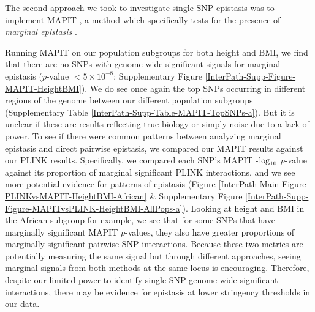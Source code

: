 \documentclass[12pt,a4paper]{article}
\def\log{{\rm log}}
\begin{document}
The second approach we took to investigate single-SNP epistasis was to implement MAPIT \citep{Crawford2017a}, a method which specifically tests for the presence of \textit{marginal epistasis} . 



Running MAPIT on our population subgroups for both height and BMI, we find that there are no SNPs with genome-wide significant signals for marginal epistasis ($p$-value $< 5\times10^{-8}$; Supplementary Figure \ref{InterPath-Supp-Figure-MAPIT-HeightBMI}). We do see once again the top SNPs occurring in different regions of the genome between our different population subgroups (Supplementary Table \ref{InterPath-Supp-Table-MAPIT-TopSNPs-a}). But it is unclear if these are results reflecting true biology or simply noise due to a lack of power. To see if there were common patterns between analyzing marginal epistasis and direct pairwise epistasis, we compared our MAPIT results against our PLINK results. Specifically, we compared each SNP's MAPIT -$\log_{10}$ $p$-value against its proportion of marginal significant PLINK interactions, and we see more potential evidence for patterns of epistasis (Figure \ref{InterPath-Main-Figure-PLINKvsMAPIT-HeightBMI-African} \& Supplementary Figure \ref{InterPath-Supp-Figure-MAPITvsPLINK-HeightBMI-AllPops-a}). Looking at height and BMI in the African subgroup for example, we see that for some SNPs that have marginally significant MAPIT $p$-values, they also have greater proportions of marginally significant pairwise SNP interactions. Because these two metrics are potentially measuring the same signal but through different approaches, seeing marginal signals from both methods at the same locus is encouraging. Therefore, despite our limited power to identify single-SNP genome-wide significant interactions, there may be evidence for epistasis at lower stringency thresholds in our data.
\end{document}
